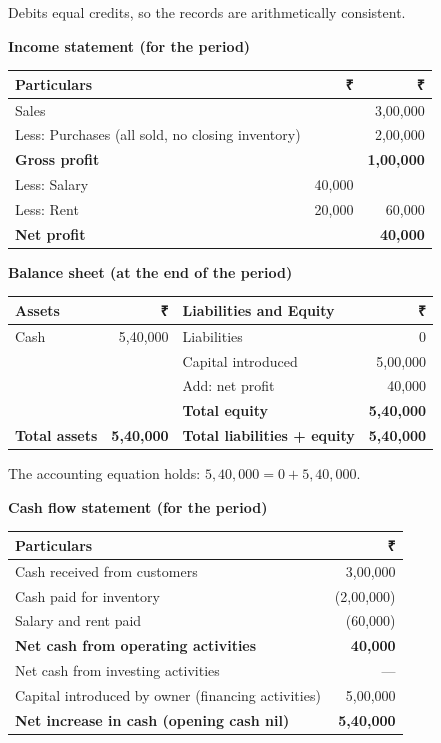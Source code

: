 \documentclass[11pt,a4paper]{article}
\newcommand{\Rs}{{\rsfont ₹}}
\begin{document}
Debits equal credits, so the records are arithmetically consistent.

\textbf{Income statement (for the period)}

\begin{center}
\small
\begin{tabular}{@{}l r r@{}}
\toprule
\rowcolor{acteal!15}\textbf{Particulars} & \textbf{\Rs} & \textbf{\Rs}\\
\midrule
Sales & & 3,00,000\\
Less: Purchases (all sold, no closing inventory) & & 2,00,000\\
\textbf{Gross profit} & & \textbf{1,00,000}\\
Less: Salary & 40,000 & \\
Less: Rent & 20,000 & 60,000\\
\midrule
\textbf{Net profit} & & \textbf{40,000}\\
\bottomrule
\end{tabular}
\end{center}

\textbf{Balance sheet (at the end of the period)}

\begin{center}
\small
\begin{tabular}{@{}l r | l r@{}}
\toprule
\rowcolor{acteal!15}\textbf{Assets} & \textbf{\Rs} & \textbf{Liabilities and Equity} & \textbf{\Rs}\\
\midrule
Cash & 5,40,000 & Liabilities & 0\\
 & & Capital introduced & 5,00,000\\
 & & Add: net profit & 40,000\\
 & & \textbf{Total equity} & \textbf{5,40,000}\\
\midrule
\textbf{Total assets} & \textbf{5,40,000} & \textbf{Total liabilities + equity} & \textbf{5,40,000}\\
\bottomrule
\end{tabular}
\end{center}

The accounting equation holds: $5{,}40{,}000=0+5{,}40{,}000$.

\textbf{Cash flow statement (for the period)}

\begin{center}
\small
\begin{tabular}{@{}l r@{}}
\toprule
\rowcolor{acteal!15}\textbf{Particulars} & \textbf{\Rs}\\
\midrule
Cash received from customers & 3,00,000\\
Cash paid for inventory & (2,00,000)\\
Salary and rent paid & (60,000)\\
\textbf{Net cash from operating activities} & \textbf{40,000}\\
Net cash from investing activities & ---\\
Capital introduced by owner (financing activities) & 5,00,000\\
\midrule
\textbf{Net increase in cash (opening cash nil)} & \textbf{5,40,000}\\
\bottomrule
\end{tabular}
\end{center}
\end{document}
